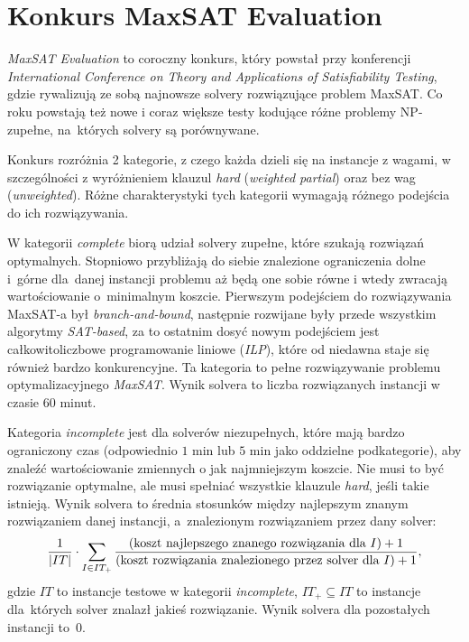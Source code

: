 \documentclass[shortabstract]{iithesis}
\begin{document}
\section{Konkurs MaxSAT Evaluation}
\textit{MaxSAT Evaluation} \cite{maxsateval} to coroczny konkurs, który powstał przy konferencji \textit{International Conference on Theory and Applications of Satisfiability Testing}, gdzie rywalizują ze sobą najnowsze solvery rozwiązujące problem MaxSAT. Co roku powstają też nowe i coraz większe testy kodujące różne problemy NP-zupełne, na~których solvery są porównywane.

Konkurs rozróżnia 2 kategorie, z czego każda dzieli się na instancje z wagami, w szczególności z wyróżnieniem klauzul \textit{hard} (\textit{weighted partial}) oraz bez wag (\textit{unweighted}). Różne charakterystyki tych kategorii wymagają różnego podejścia do ich rozwiązywania.

W kategorii \textit{complete} biorą udział solvery zupełne, które szukają rozwiązań optymalnych. Stopniowo przybliżają do siebie znalezione ograniczenia dolne i~górne dla~danej instancji problemu aż będą one sobie równe i wtedy zwracają wartościowanie o~minimalnym koszcie. Pierwszym podejściem do rozwiązywania MaxSAT-a był \textit{branch-and-bound}, następnie rozwijane były przede wszystkim algorytmy \textit{SAT-based}, za to ostatnim dosyć nowym podejściem jest całkowitoliczbowe programowanie liniowe (\textit{ILP}), które od niedawna staje się również bardzo konkurencyjne. Ta kategoria to pełne rozwiązywanie problemu optymalizacyjnego \textit{MaxSAT}. Wynik solvera to liczba rozwiązanych instancji w czasie $60$ minut. 

Kategoria \textit{incomplete} jest dla solverów niezupełnych, które 
mają bardzo ograniczony czas (odpowiednio $1$ min lub $5$ min jako oddzielne podkategorie), aby znaleźć wartościowanie zmiennych o jak najmniejszym koszcie. Nie musi to być rozwiązanie optymalne, ale musi spełniać wszystkie klauzule \textit{hard}, jeśli takie istnieją. Wynik solvera to średnia stosunków między najlepszym znanym rozwiązaniem danej instancji, a~znalezionym rozwiązaniem przez dany solver:
\begin{equation}
\frac{1}{|IT|}\cdot\sum_{I \in IT_+} \frac{\textnormal{(koszt najlepszego znanego rozwiązania dla $I$)} + 1}{\textnormal{(koszt rozwiązania znalezionego przez solver dla $I$)} + 1},
\label{scoreeval}
\end{equation}
gdzie $IT$ to instancje testowe w kategorii \textit{incomplete}, $IT_+ \subseteq IT$ to instancje dla~których solver znalazł jakieś rozwiązanie. Wynik solvera dla pozostałych instancji to~$0$.
\end{document}
